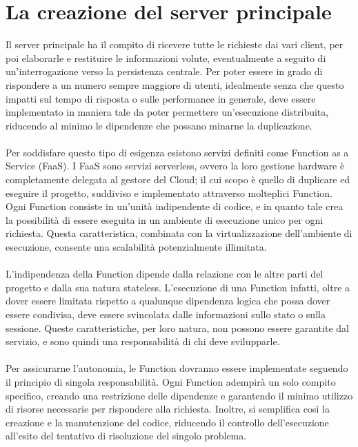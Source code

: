 \section{La creazione del server principale}

Il server principale ha il compito di ricevere tutte le richieste dai vari client, 
per poi elaborarle e restituire le informazioni volute, 
eventualmente a seguito di un'interrogazione verso la persistenza centrale.
Per poter essere in grado di rispondere a un numero sempre maggiore di utenti, 
idealmente senza che questo impatti sul tempo di risposta o sulle performance in generale,
deve essere implementato in maniera tale da poter permettere un'esecuzione distribuita,
riducendo al minimo le dipendenze che possano minarne la duplicazione.\\
\\
Per soddisfare questo tipo di esigenza
esistono servizi definiti come Function as a Service (FaaS).
I FaaS sono servizi serverless, 
ovvero la loro gestione hardware è completamente delegata al gestore del Cloud;
il cui scopo è quello di duplicare ed eseguire il progetto, 
suddiviso e implementato attraverso molteplici Function.
Ogni Function consiste in un'unità indipendente di codice, 
e in quanto tale crea la possibilità di essere eseguita in un ambiente di esecuzione unico per ogni richiesta.
Questa caratteristica, combinata con la virtualizzazione dell’ambiente di esecuzione, 
consente una scalabilità potenzialmente illimitata.\\
\\
L’indipendenza della Function dipende dalla relazione con le altre parti del progetto e 
dalla sua natura stateless. 
L'esecuzione di una Function infatti, 
oltre a dover essere limitata rispetto a qualunque dipendenza logica che possa dover essere condivisa,
deve essere svincolata dalle informazioni sullo stato o sulla sessione.
Queste caratteristiche, per loro natura, non possono essere garantite dal servizio, 
e sono quindi una responsabilità di chi deve svilupparle.\\
\\
Per assicurarne l'autonomia, 
le Function dovranno essere implementate seguendo il principio di singola responsabilità.
Ogni Function adempirà un solo compito specifico,
creando una restrizione delle dipendenze e
garantendo il minimo utilizzo di risorse necessarie per rispondere alla richiesta.
Inoltre, si semplifica così la creazione e la manutenzione del codice,
riducendo il controllo dell'esecuzione all'esito del tentativo di risoluzione del singolo problema.
\clearpage
